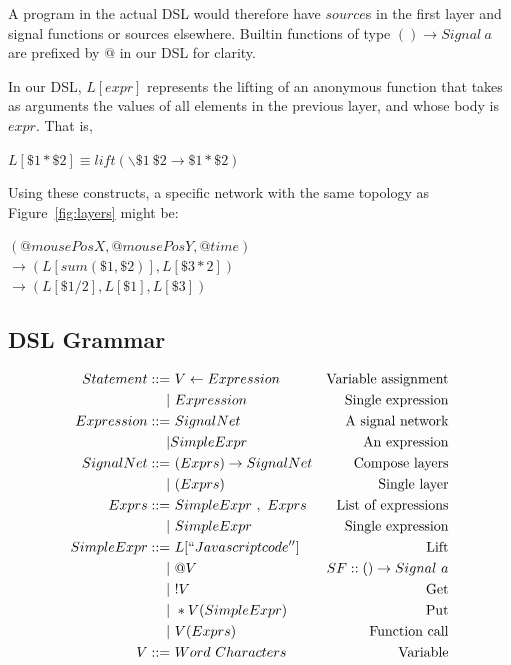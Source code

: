 \documentclass[twocolumn,11pt,english]{article}
\begin{document}
A program in the actual DSL would therefore have $source$s in the first layer and signal functions or sources elsewhere. Builtin functions of type $() \rightarrow Signal~a$ are prefixed by $@$ in our DSL for clarity. 

In our DSL, $L[expr]$ represents the lifting of an anonymous function that takes as arguments the values of all elements in the previous layer, and whose body is $expr$. That is, 
\begin{center}
$L[\$1 * \$2] \equiv lift (\backslash \$1 ~\$2 \rightarrow \$1 * \$2)$
\end{center}
Using these constructs, a specific network with the same topology as Figure~\ref{fig:layers} might be:
\begin{center}
$(@mousePosX, @mousePosY, @time)$
\\ $\rightarrow (L[sum(\$1, \$2)], L[\$3 * 2])$
\\ $\rightarrow (L[\$1 / 2], L[\$1], L[\$3])$
\end{center}
\subsection{DSL Grammar}
\footnotesize
\begin{align*}
  Statement ::=& ~V \leftarrow Expression &\text{Variable assignment}\\
  |& ~Expression &\text{Single expression}\\
  Expression ::=& ~SignalNet &\text{A signal network}\\
  |& SimpleExpr &\text{An expression}\\
  SignalNet ::=& ~( Exprs ) \rightarrow SignalNet &\text{Compose layers}\\
   |& ~(Exprs ) &\text{Single layer} \\
  Exprs ::=& ~SimpleExpr ~,~ Exprs &\text{List of expressions}\\
  |& ~SimpleExpr &\text{Single expression}\\
  SimpleExpr ::=& ~L[``Javascript code''] &\text{Lift}\\
  |& ~ @V &\text{$SF :: () \rightarrow Signal~a$}\\
  |& ~ !V &\text{Get}\\
  |& ~ *V(SimpleExpr) &\text{Put}\\ 
  |& ~ V( Exprs ) &\text{Function call}\\
  V ::=& ~Word~Characters &\text{Variable}
\end{align*}
\normalsize
\end{document}
